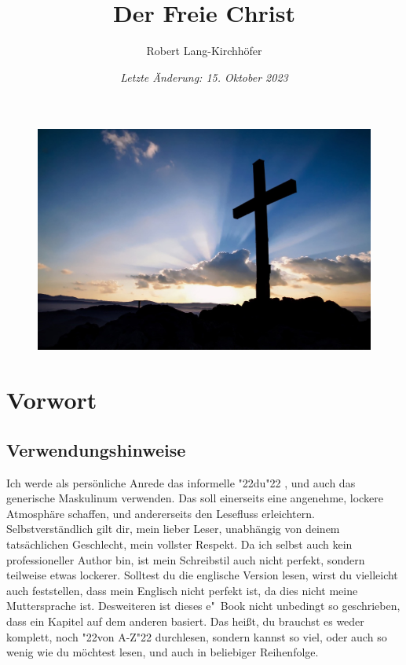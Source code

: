 \documentclass[10pt,a5paper]{article}
\title{\textbf{Der Freie Christ}}
\author{Robert Lang-Kirchh\"ofer}
\date{\textit{Letzte \"Anderung: 15. Oktober 2023}}
\newcommand{\q}[1]{\char"22{#1}\char"22 }
\begin{document}
	\setlength{\parindent}{0mm}
	\maketitle
	\begin{figure}[h]
		\centering
		\includegraphics[width=1\textwidth,keepaspectratio]{"FreeChristian.jpeg"}
	\end{figure}

	\newpage
	\pagecolor{white}
	\tableofcontents
	
	\newpage
	\section{Vorwort}

	\subsection{Verwendungshinweise}
		Ich werde als pers\"onliche Anrede das informelle \q{du},
		und auch das generische Maskulinum verwenden.
		Das soll einerseits eine angenehme,
		lockere Atmosph\"are schaffen,
		und andererseits den Lesefluss erleichtern.
		Selbstverst\"andlich gilt dir,
		mein lieber Leser,
		unabh\"angig von deinem tats\"achlichen Geschlecht,
		mein vollster Respekt.
		Da ich selbst auch kein professioneller Author bin,
		ist mein Schreibstil auch nicht perfekt,
		sondern teilweise etwas lockerer.
		Solltest du die englische Version lesen,
		wirst du vielleicht auch feststellen,
		dass mein Englisch nicht perfekt ist,
		da dies nicht meine Muttersprache ist.
		Desweiteren ist dieses e"~Book nicht unbedingt so geschrieben,
		dass ein Kapitel auf dem anderen basiert.
		Das hei{\ss}t,
		du brauchst es weder komplett,
		noch \q{von A-Z} durchlesen,
		sondern kannst so viel,
		oder auch so wenig wie du m\"ochtest lesen,
		und auch in beliebiger Reihenfolge.
\end{document}
